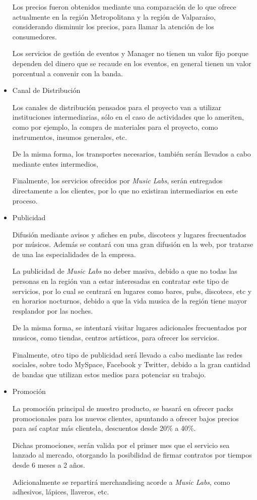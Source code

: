 \begin{itemize}
    Los precios fueron obtenidos mediante una comparación de lo que ofrece actualmente
    en la región Metropolitana y la región de Valparaíso, considerando
    disminuir los precios, para llamar la atención de los consumedores.

    Los servicios de gestión de eventos y Manager no tienen un valor fijo porque dependen del dinero
    que se recaude en los eventos, en general tienen un valor porcentual a convenir con la banda.

\item{Canal de Distribución}

    Los canales de distribución pensados para el proyecto van a utilizar instituciones intermediarias,
    sólo en el caso de actividades que lo ameriten, como por ejemplo, la compra de materiales para
    el proyecto, como instrumentos, insumos generales, etc.
   
    De la misma forma, los transportes necesarios, también serán llevados a cabo mediante entes
    intermedios,  

    Finalmente, los servicios ofrecidos por \emph{Music Labs}, serán entregados directamente
    a los clientes, por lo que no existiran intermediarios en este proceso.

\item{Publicidad}

	Difusión mediante avisos y afiches en pubs, discotecs y lugares frecuentados por músicos.
    Además se contará con una gran difusión en la web, por tratarse de una las especialidades de la empresa. 

    La publicidad de \emph{Music Labs} no deber masiva, debido a que no todas las personas
    en la región van a estar interesadas en contratar este tipo de servicios,
    por lo cual se centrará en lugares como bares, pubs, discotecs, etc y en horarios
    nocturnos, debido a que la vida musica de la región tiene mayor resplandor
    por las noches.

    De la misma forma, se intentará visitar lugares adicionales frecuentados por musicos,
    como tiendas, centros artísticos, para ofrecer los servicios.

    Finalmente,
    otro tipo de publicidad será llevado a cabo mediante las redes sociales,
    sobre todo MySpace, Facebook y Twitter, debido a la gran cantidad de bandas
    que utilizan estos medios para potenciar su trabajo.

\item{Promoción}

    La promoción principal de nuestro producto, se basará en ofrecer packs promocionales para los nuevos
    clientes, apuntando a ofrecer bajos precios para así captar más clientela, descuentos desde 20\% a 40\%.

    Dichas promociones, serán valida por el primer mes que el servicio sea lanzado al mercado,
    otorgando la posibilidad de firmar contratos por tiempos desde 6 meses a 2 años.

    Adicionalmente se repartirá merchandising acorde a \emph{Music Labs},
    como adhesivos, lápices, llaveros, etc.

\end{itemize}

